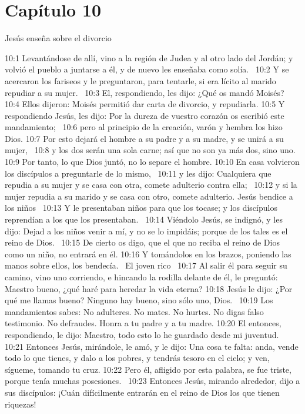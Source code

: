\section*{Capítulo 10}
Jesús enseña sobre el divorcio  

10:1 Levantándose de allí, vino a la región de Judea y al otro lado del Jordán; y volvió el pueblo a juntarse a él, y de nuevo les enseñaba como solía.  
10:2 Y se acercaron los fariseos y le preguntaron, para tentarle, si era lícito al marido repudiar a su mujer.  
10:3 El, respondiendo, les dijo: ¿Qué os mandó Moisés? 
10:4 Ellos dijeron: Moisés permitió dar carta de divorcio, y repudiarla. 
10:5 Y respondiendo Jesús, les dijo: Por la dureza de vuestro corazón os escribió este mandamiento;  
10:6 pero al principio de la creación, varón y hembra los hizo Dios. 
10:7 Por esto dejará el hombre a su padre y a su madre, y se unirá a su mujer,  
10:8 y los dos serán una sola carne; así que no son ya más dos, sino uno.  
10:9 Por tanto, lo que Dios juntó, no lo separe el hombre. 
10:10 En casa volvieron los discípulos a preguntarle de lo mismo,  
10:11 y les dijo: Cualquiera que repudia a su mujer y se casa con otra, comete adulterio contra ella;  
10:12 y si la mujer repudia a su marido y se casa con otro, comete adulterio. 
Jesús bendice a los niños   
10:13 Y le presentaban niños para que los tocase; y los discípulos reprendían a los que los presentaban.  
10:14 Viéndolo Jesús, se indignó, y les dijo: Dejad a los niños venir a mí, y no se lo impidáis; porque de los tales es el reino de Dios.  
10:15 De cierto os digo, que el que no reciba el reino de Dios como un niño, no entrará en él. 
10:16 Y tomándolos en los brazos, poniendo las manos sobre ellos, los bendecía.  
El joven rico   
10:17 Al salir él para seguir su camino, vino uno corriendo, e hincando la rodilla delante de él, le preguntó: Maestro bueno, ¿qué haré para heredar la vida eterna? 
10:18 Jesús le dijo: ¿Por qué me llamas bueno? Ninguno hay bueno, sino sólo uno, Dios.  
10:19 Los mandamientos sabes: No adulteres. No mates. No hurtes. No digas falso testimonio. No defraudes. Honra a tu padre y a tu madre. 
10:20 El entonces, respondiendo, le dijo: Maestro, todo esto lo he guardado desde mi juventud.  
10:21 Entonces Jesús, mirándole, le amó, y le dijo: Una cosa te falta: anda, vende todo lo que tienes, y dalo a los pobres, y tendrás tesoro en el cielo; y ven, sígueme, tomando tu cruz. 
10:22 Pero él, afligido por esta palabra, se fue triste, porque tenía muchas posesiones.  
10:23 Entonces Jesús, mirando alrededor, dijo a sus discípulos: ¡Cuán difícilmente entrarán en el reino de Dios los que tienen riquezas!  
